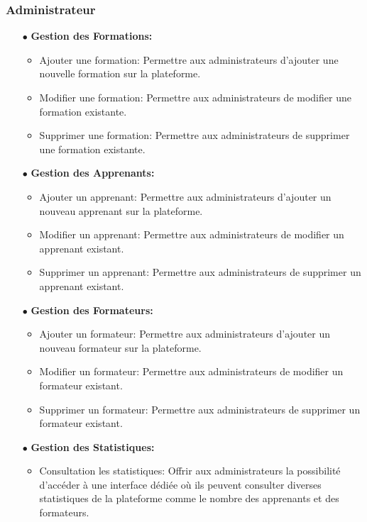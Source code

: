 \subsubsection*{Administrateur}
\begin{itemize}
    \item[$\bullet$] \textbf{Gestion des Formations:}
    \begin{itemize}
        \item  Ajouter une formation: Permettre aux administrateurs d'ajouter une nouvelle formation sur la plateforme.
        \item  Modifier une formation: Permettre aux administrateurs de modifier une formation existante.
        \item  Supprimer une formation: Permettre aux administrateurs de supprimer une formation existante.
    \end{itemize}
    \item[$\bullet$] \textbf{Gestion des Apprenants:}
    \begin{itemize}
        \item  Ajouter un apprenant: Permettre aux administrateurs d'ajouter un nouveau apprenant sur la plateforme.
        \item  Modifier un apprenant: Permettre aux administrateurs de modifier un apprenant existant.
        \item  Supprimer un apprenant: Permettre aux administrateurs de supprimer un apprenant existant.
    \end{itemize}
    \item[$\bullet$] \textbf{Gestion des Formateurs:}
    \begin{itemize}
        \item  Ajouter un formateur: Permettre aux administrateurs d'ajouter un nouveau formateur sur la plateforme.
        \item  Modifier un formateur: Permettre aux administrateurs de modifier un formateur existant.
        \item  Supprimer un formateur: Permettre aux administrateurs de supprimer un formateur existant.
    \end{itemize}
    \item[$\bullet$] \textbf{Gestion des Statistiques:}
    \begin{itemize}
        \item  Consultation les statistiques: Offrir aux administrateurs la possibilité d'accéder à une interface dédiée où ils peuvent consulter diverses statistiques de la plateforme comme le nombre des apprenants et des formateurs.
    \end{itemize}
\end{itemize}


